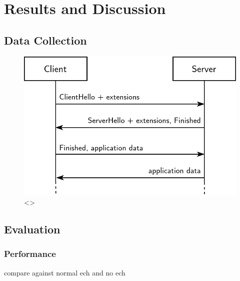 \chapter{Results and Discussion}\label{Results}

\blindtext









\section{Data Collection}

\blindtext

\begin{figure}[ht]
\centerline{\includegraphics[width=120mm]{images/tls-handshake.png}}
\caption[TODO wireshark]{<>}
\label{wireshark_screenshot_figure}
\end{figure}









\section{Evaluation}

\blindtext

\subsection{Performance}

compare against normal ech and no ech
\blindtext

